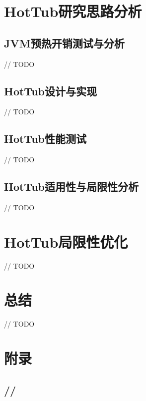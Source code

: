 \documentclass[lang=cn,12pt,a4paper,cite=authoryear]{elegantpaper}
\begin{document}
\section{HotTub研究思路分析}
\subsection{JVM预热开销测试与分析}
// TODO
\subsection{HotTub设计与实现}
// TODO
\subsection{HotTub性能测试}
// TODO
\subsection{HotTub适用性与局限性分析}
// TODO

\section{HotTub局限性优化}
// TODO

\section{总结}
// TODO

\nocite{*}
\cleardoublepage


\appendix
\addappheadtotoc
\section{附录}

\subsection{//}
\end{document}
